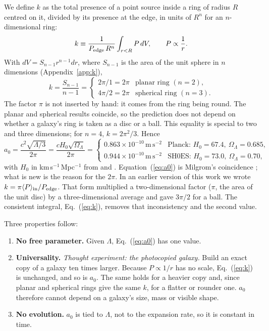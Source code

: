 \documentclass[11pt]{article}
\newcommand{\unit}[1]{\,\mathrm{#1}}
\newcommand{\aunit}{\times10^{-10}\unit{m\,s^{-2}}}
\begin{document}
We define $k$ as the total presence of a point source inside a ring of radius $R$ centred on it, divided by its presence at the edge, in units of $R^n$ for an $n$-dimensional ring:
\begin{equation}
k\equiv\frac{1}{P_{\rm edge}\,R^n}\int_{r<R}P\,dV,\qquad P\propto\frac1r.
\label{eq:k}
\end{equation}
With $dV=S_{n-1}r^{n-1}dr$, where $S_{n-1}$ is the area of the unit sphere in $n$ dimensions (Appendix~\ref{app:k}),
\begin{equation}
k=\frac{S_{n-1}}{n-1}=
\begin{cases}
2\pi/1=2\pi & \text{planar ring } (n=2),\\
4\pi/2=2\pi & \text{spherical ring } (n=3).
\end{cases}
\end{equation}
The factor $\pi$ is not inserted by hand: it comes from the ring being round. The planar and spherical results coincide, so the prediction does not depend on whether a galaxy's ring is taken as a disc or a ball. This equality is special to two and three dimensions; for $n=4$, $k=2\pi^2/3$. Hence
\begin{equation}
a_0=\frac{c^2\sqrt{\Lambda/3}}{2\pi}=\frac{cH_0\sqrt{\Omega_\Lambda}}{2\pi}=
\begin{cases}
0.863\aunit & \text{Planck: } H_0=67.4,\ \Omega_\Lambda=0.685,\\
0.944\aunit & \text{SH0ES: } H_0=73.0,\ \Omega_\Lambda=0.70,
\end{cases}
\label{eq:a0}
\end{equation}
with $H_0$ in km\,s$^{-1}$\,Mpc$^{-1}$ from \citet{Planck2020} and \citet{Riess2022}. Equation~(\ref{eq:a0}) is Milgrom's coincidence \citep{Milgrom1999,Milgrom2016}; what is new is the reason for the $2\pi$. In an earlier version of this work we wrote $k=\pi\langle P\rangle_{\rm in}/P_{\rm edge}$. That form multiplied a two-dimensional factor ($\pi$, the area of the unit disc) by a three-dimensional average and gave $3\pi/2$ for a ball. The consistent integral, Eq.~(\ref{eq:k}), removes that inconsistency and the second value.

Three properties follow:
\begin{enumerate}
\item \textbf{No free parameter.} Given $\Lambda$, Eq.~(\ref{eq:a0}) has one value.
\item \textbf{Universality.} \emph{Thought experiment: the photocopied galaxy.} Build an exact copy of a galaxy ten times larger. Because $P\propto1/r$ has no scale, Eq.~(\ref{eq:k}) is unchanged, and so is $a_0$. The same holds for a heavier copy and, since planar and spherical rings give the same $k$, for a flatter or rounder one. $a_0$ therefore cannot depend on a galaxy's size, mass or visible shape.
\item \textbf{No evolution.} $a_0$ is tied to $\Lambda$, not to the expansion rate, so it is constant in time.
\end{enumerate}
\end{document}
